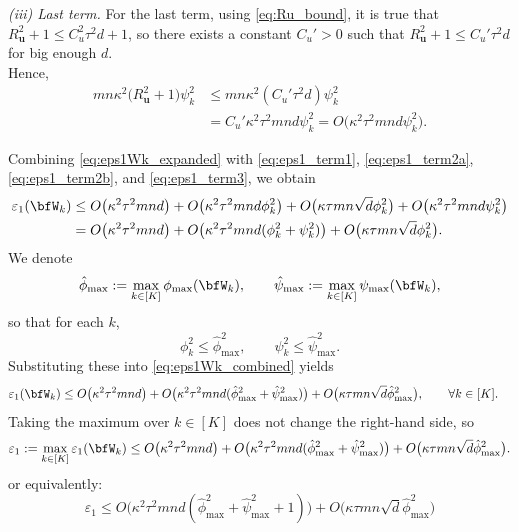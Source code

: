 \documentclass[10pt]{article} %
\theoremstyle{definition}
\theoremstyle{plain}
\def\bfu{{\mathbf{u}}}\def\bfv{{\mathbf{v}}}\def\bfw{{\mathbf{w}}}\def\bfx{{\mathbf{x}}}
\begin{document}
\medskip\noindent
\emph{(iii) Last term.}
For the last term, using \eqref{eq:Ru_bound}, it is true that
$R_{\bfu}^2+1 \le C_u^2\tau^2 d + 1$, so there exists a constant $C_u'>0$
such that $R_{\bfu}^2 + 1  \le  C_u'\tau^2 d$ for big enough $d$.\\
Hence,
\begin{align}
    mn\kappa^2\big(R_{\bfu}^2+1\big)\psi_k^2
    &\le
    mn\kappa^2(C_u'\tau^2 d) \psi_k^2
    \nonumber\\
    &=
    C_u' \kappa^2\tau^2 m n d \psi_k^2
     = 
    O\big(\kappa^2\tau^2 m n d \psi_k^2\big).
    \label{eq:eps1_term3}
\end{align}

Combining \eqref{eq:eps1Wk_expanded} with
\eqref{eq:eps1_term1}, \eqref{eq:eps1_term2a}, \eqref{eq:eps1_term2b},
and \eqref{eq:eps1_term3}, we obtain
\begin{align}
    \varepsilon_1(\bfW_k)
    &\le
    O\big(\kappa^2\tau^2 m n d\big)
     + 
    O\big(\kappa^2\tau^2 m n d \phi_k^2\big)
     + 
    O\big(\kappa\tau m n \sqrt{d} \phi_k^2\big)
     + 
    O\big(\kappa^2\tau^2 m n d \psi_k^2\big)
    \nonumber\\
    &=
    O\big(\kappa^2\tau^2 m n d\big)
    +
    O\big(\kappa^2\tau^2 m n d(\phi_k^2 + \psi_k^2)\big)
    +
    O\big(\kappa\tau m n \sqrt{d} \phi_k^2\big).
    \label{eq:eps1Wk_combined}
\end{align}
We denote
\[
    \hat\phi_{\max} := \max_{k\in[K]}\phi_{\max}(\bfW_k),
    \qquad
    \hat\psi_{\max} := \max_{k\in[K]}\psi_{\max}(\bfW_k),
\]
so that for each $k$,
\[
    \phi_k^2 \le \hat\phi_{\max}^2,
    \qquad
    \psi_k^2 \le \hat\psi_{\max}^2.
\]
Substituting these into \eqref{eq:eps1Wk_combined} yields
\begin{align}
    \varepsilon_1(\bfW_k)
    &\le
    O\big(\kappa^2\tau^2 m n d\big)
    +
    O\big(\kappa^2\tau^2 m n d(\hat\phi_{\max}^2 + \hat\psi_{\max}^2)\big)
    +
    O\big(\kappa\tau m n \sqrt{d}  \hat\phi_{\max}^2\big),
    \qquad \forall k\in[K].
    \label{eq:eps1Wk_uniform}
\end{align}
Taking the maximum over $k\in[K]$ does not change the right-hand side,
so
\begin{equation}
\label{eq:eps1_before_simplify}
    \varepsilon_1
    :=
    \max_{k\in[K]}\varepsilon_1(\bfW_k)
     \le 
    O\big(\kappa^2\tau^2 m n d\big)
    +
    O\big(\kappa^2\tau^2 m n d(\hat\phi_{\max}^2 + \hat\psi_{\max}^2)\big)
    +
    O\big(\kappa\tau m n \sqrt{d}  \hat\phi_{\max}^2\big).
\end{equation}
or equivalently: 
\begin{equation}
\label{eq:eps1_final}
    \boxed{\varepsilon_1
     \le 
    O\big(\kappa^2\tau^2 m n d(\hat\phi_{\max}^2 + \hat\psi_{\max}^2 +1)\big)
    +
    O\big(\kappa\tau m n \sqrt{d}  \hat\phi_{\max}^2\big)}
\end{equation}
\end{document}
